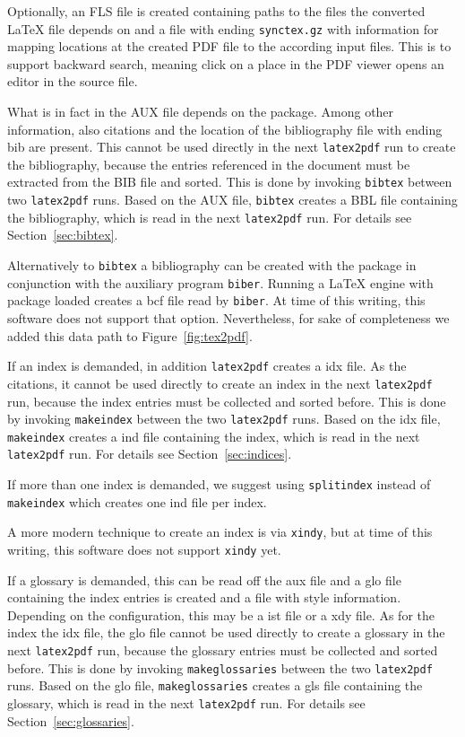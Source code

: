 Optionally, an FLS file is created containing paths to the files 
the converted \LaTeX{} file depends on 
and a file with ending \texttt{synctex.gz} 
with information for mapping locations at the created PDF file 
to the according input files. 
This is to support backward search, meaning click on a place in the PDF viewer 
opens an editor in the source file. 

What is in fact in the AUX file depends on the package. 
Among other information, 
also citations and the location of the bibliography file with ending bib 
are present. 
This cannot be used directly in the next \texttt{latex2pdf} run 
to create the bibliography, 
because the entries referenced in the document must be extracted from the BIB file 
and sorted. 
This is done by invoking \texttt{bibtex} between two \texttt{latex2pdf} runs. 
Based on the AUX file, \texttt{bibtex} creates a BBL file 
containing the bibliography, which is read in the next \texttt{latex2pdf} run. 
For details see Section~\ref{sec:bibtex}. 

Alternatively to \texttt{bibtex} a bibliography can be created 
with the package  in conjunction with the auxiliary program \texttt{biber}. 
Running a \LaTeX{} engine with package  loaded 
creates a \gls{bcf} file read by \texttt{biber}. 
At time of this writing, this software does not support that option. 
Nevertheless, for sake of completeness we added this data path to Figure~\ref{fig:tex2pdf}. 

If an index is demanded, 
in addition \texttt{latex2pdf} creates a \gls{idx} file. 
As the citations, it cannot be used directly to create an index in
the next \texttt{latex2pdf} run, 
because the index entries must be collected and sorted before. 
This is done by invoking \texttt{makeindex} 
between the two \texttt{latex2pdf} runs. 
Based on the \gls{idx} file, \texttt{makeindex} creates a \gls{ind} file 
containing the index, which is read in the next \texttt{latex2pdf} run. 
For details see Section~\ref{sec:indices}. 

If more than one index is demanded, 
we suggest using \texttt{splitindex} instead of \texttt{makeindex} 
which creates one \gls{ind} file per index. 

A more modern technique to create an index is via \texttt{xindy}, 
but at time of this writing, this software does not support \texttt{xindy} yet. 

If a glossary is demanded, this can be read off the \gls{aux} file 
and a \gls{glo} file containing the index entries 
is created and a file with style information. 
Depending on the configuration, 
this may be a \gls{ist} file or a \gls{xdy} file. 
As for the index the \gls{idx} file, 
the \gls{glo} file cannot be used directly to create a glossary in
the next \texttt{latex2pdf} run, 
because the glossary entries must be collected and sorted before. 
This is done by invoking \texttt{makeglossaries} 
between the two \texttt{latex2pdf} runs. 
Based on the \gls{glo} file, \texttt{makeglossaries} creates a \gls{gls} file 
containing the glossary, which is read in the next \texttt{latex2pdf} run. 
For details see Section~\ref{sec:glossaries}. 

